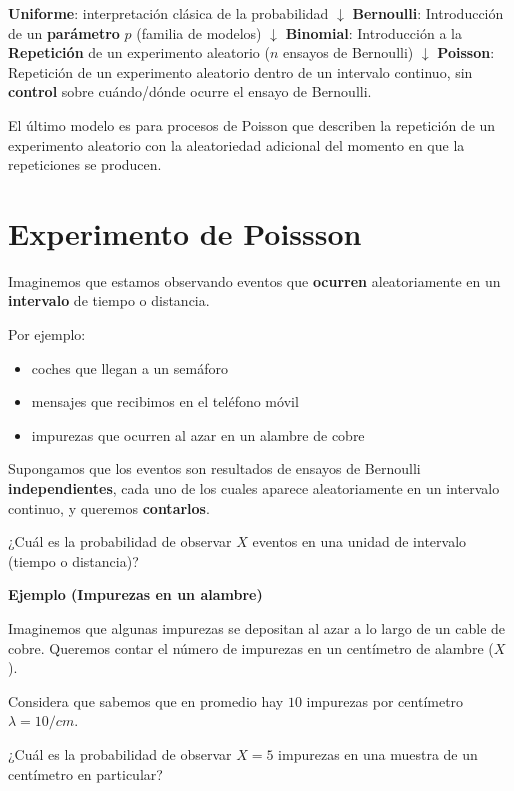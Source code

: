 \documentclass[
]{book}
\providecommand{\tightlist}{%
  \setlength{\itemsep}{0pt}\setlength{\parskip}{0pt}}
\begin{document}
\textbf{Uniforme}: interpretación clásica de la probabilidad
\(\downarrow\)
\textbf{Bernoulli}: Introducción de un \textbf{parámetro} \(p\) (familia de modelos)
\(\downarrow\)
\textbf{Binomial}: Introducción a la \textbf{Repetición} de un experimento aleatorio (\(n\) ensayos de Bernoulli)
\(\downarrow\)
\textbf{Poisson}: Repetición de un experimento aleatorio dentro de un intervalo continuo, sin \textbf{control} sobre cuándo/dónde ocurre el ensayo de Bernoulli.

El último modelo es para procesos de Poisson que describen la repetición de un experimento aleatorio con la aleatoriedad adicional del momento en que la repeticiones se producen.

\hypertarget{experimento-de-poissson}{%
\section{Experimento de Poissson}\label{experimento-de-poissson}}

Imaginemos que estamos observando eventos que \textbf{ocurren} aleatoriamente en un \textbf{intervalo} de tiempo o distancia.

Por ejemplo:

\begin{itemize}
\tightlist
\item
  coches que llegan a un semáforo
\item
  mensajes que recibimos en el teléfono móvil
\item
  impurezas que ocurren al azar en un alambre de cobre
\end{itemize}

Supongamos que los eventos son resultados de ensayos de Bernoulli \textbf{independientes}, cada uno de los cuales aparece aleatoriamente en un intervalo continuo, y queremos \textbf{contarlos}.

¿Cuál es la probabilidad de observar \(X\) eventos en una unidad de intervalo (tiempo o distancia)?

\textbf{Ejemplo (Impurezas en un alambre)}

Imaginemos que algunas impurezas se depositan al azar a lo largo de un cable de cobre. Queremos contar el número de impurezas en un centímetro de alambre (\(X\)).

Considera que sabemos que en promedio hay \(10\) impurezas por centímetro \(\lambda=10/cm\).

¿Cuál es la probabilidad de observar \(X=5\) impurezas en una muestra de un centímetro en particular?
\end{document}
